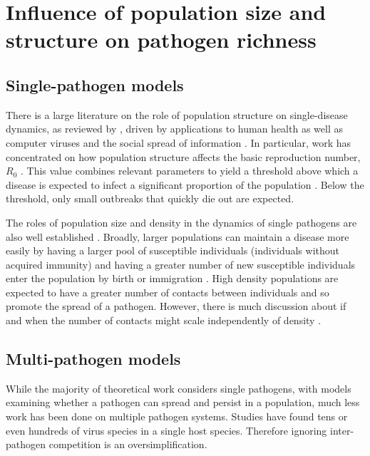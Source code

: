 \section{Influence of population size and structure on pathogen richness}



\subsection{Single-pathogen models}

There is a large literature on the role of population structure on single-disease dynamics, as reviewed by \textcite{pastor2015epidemic}, driven by applications to human health as well as computer viruses \cite{pastor2001epidemic} and the social spread of information \cite{goffman1964generalization}.
In particular, work has concentrated on how population structure affects the basic reproduction number, $R_0$ \cite{colizza2007invasion, barthelemy2010fluctuation, wu2013threshold, may2001infection, pastor2001epidemic}. 
This value combines relevant parameters to yield a threshold above which a disease is expected to infect a significant proportion of the population \cite{may1979population, anderson1979population}.
Below the threshold, only small outbreaks that quickly die out are expected.

The roles of population size and density in the dynamics of single pathogens are also well established \cite{may1979population, anderson1979population, heesterbeek2002brief, lloyd2005should}.
Broadly, larger populations can maintain a disease more easily by having a larger pool of susceptible individuals (individuals without acquired immunity) and having a greater number of new susceptible individuals enter the population by birth or immigration \cite{may1979population, anderson1979population}.
High density populations are expected to have a greater number of contacts between individuals and so promote the spread of a pathogen.
However, there is much discussion about if and when the number of contacts might scale independently of density \cite{mccallum2001should}.

\subsection{Multi-pathogen models}
While the majority of theoretical work considers single pathogens, with models examining whether a pathogen can spread and persist in a population, much less work has been done on multiple pathogen systems.
Studies have found tens \cite{anthony2013strategy} or even hundreds \cite{anthony2015non} of virus species in a single host species.
Therefore ignoring inter-pathogen competition is an oversimplification.

